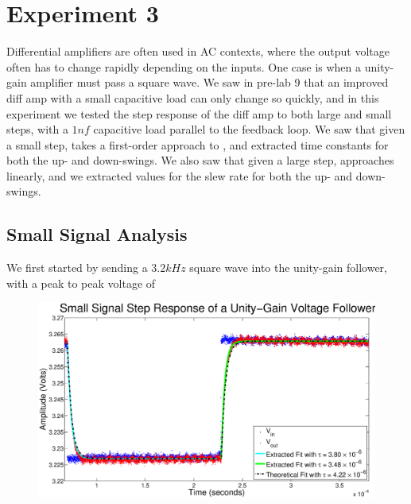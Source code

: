\section*{Experiment 3}
Differential amplifiers are often used in AC contexts, where the output voltage often has to change rapidly depending on the inputs. One case is when a unity-gain amplifier must pass a square wave. We saw in pre-lab 9 that an improved diff amp with a small capacitive load can only change \Vout so quickly, and in this experiment we tested the step response of the diff amp to both large and small steps, with a $1 nf$ capacitive load parallel to the feedback loop. We saw that given a small step, \Vout takes a first-order approach to \Vin, and extracted time constants for both the up- and down-swings. We also saw that given a large step, \Vout approaches \Vin linearly, and we extracted values for the slew rate for both the up- and down-swings.

\subsection*{Small Signal Analysis}


We first started by sending a $3.2 kHz$ square wave into the unity-gain follower, with a peak to peak voltage of 

\begin{figure}[H]
\centering
\includegraphics[width=\linewidth]{../Figures/Exp3P2.eps}
\caption{}
\label{fig:exp3p2}
\end{figure}

